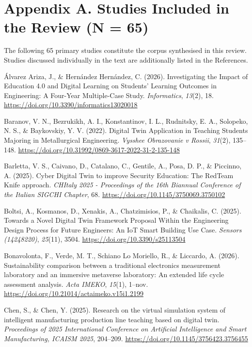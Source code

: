 \section{Appendix A. Studies Included in the Review (N = 65)}\label{appendix-a.-studies-included-in-the-review-n-65}

The following 65 primary studies constitute the corpus synthesised in this review. Studies discussed individually in the text are additionally listed in the References.

Álvarez Ariza, J., \& Hernández Hernández, C. (2026). Investigating the
Impact of Education 4.0 and Digital Learning on Students' Learning
Outcomes in Engineering: A Four-Year Multiple-Case Study. \emph{Informatics},
\emph{13}(2), 18. \url{https://doi.org/10.3390/informatics13020018}

Baranov, V. N., Bezrukikh, A. I., Konstantinov, I. L., Rudnitsky, E. A.,
Solopeko, N. S., \& Baykovskiy, Y. V. (2022). Digital Twin Application in
Teaching Students Majoring in Metallurgical Engineering. \emph{Vysshee
Obrazovanie v Rossii}, \emph{31}(2), 135--148.
\url{https://doi.org/10.31992/0869-3617-2022-31-2-135-148}

Barletta, V. S., Caivano, D., Catalano, C., Gentile, A., Posa, D. P., \&
Piccinno, A. (2025). Cyber Digital Twin to improve Security Education:
The RedTeam Knife approach. \emph{CHItaly 2025 - Proceedings of the 16th
Biannual Conference of the Italian SIGCHI Chapter}, 68.
\url{https://doi.org/10.1145/3750069.3750102}

Boltsi, A., Kosmanos, D., Xenakis, A., Chatzimisios, P., \& Chaikalis, C.
(2025). Towards a Novel Digital Twin Framework Proposal Within the
Engineering Design Process for Future Engineers: An IoT Smart Building
Use Case. \emph{Sensors (14248220)}, \emph{25}(11), 3504.
\url{https://doi.org/10.3390/s25113504}

Bonavolonta, F., Verde, M. T., Schiano Lo Moriello, R., \& Liccardo, A.
(2026). Sustainability comparison between a traditional electronics
measurement laboratory and an immersive metaverse laboratory: An
extended life cycle assessment analysis. \emph{Acta IMEKO}, \emph{15}(1), 1--nov.
\url{https://doi.org/10.21014/actaimeko.v15i1.2199}

Chen, S., \& Chen, Y. (2025). Research on the virtual simulation system
of intelligent manufacturing production line teaching based on digital
twin. \emph{Proceedings of 2025 International Conference on Artificial
Intelligence and Smart Manufacturing, ICAISM 2025}, 204--209.
\url{https://doi.org/10.1145/3756423.3756455}

